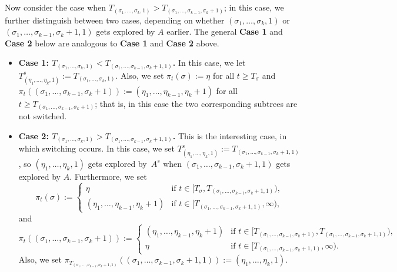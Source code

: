\documentclass[11pt]{article}
\numberwithin{equation}{section}
\theoremstyle{definition}
\begin{document}
Now consider the case when $T_{(\sigma_{1}, \dots, \sigma_{k}, 1)} > T_{(\sigma_{1}, \ldots, \sigma_{k-1}, \sigma_{k} + 1)}$; 
in this case, we further distinguish between two cases, 
depending on whether 
$(\sigma_{1}, \dots, \sigma_{k}, 1)$ 
or 
$\left(\sigma_{1}, \dots, \sigma_{k-1}, \sigma_{k} + 1, 1 \right)$
gets explored by $A$ earlier. 
The general \textbf{Case 1} and \textbf{Case 2} below are analogous to \textbf{Case 1} and \textbf{Case 2} above.
\begin{itemize}
\item \textbf{Case 1: $T_{(\sigma_{1}, \ldots, \sigma_{k}, 1)} < T_{(\sigma_{1}, \ldots, \sigma_{k-1}, \sigma_{k} + 1, 1)}$.} 
In this case, we let 
$T^{s}_{(\eta_{1}, \dots, \eta_{k}, 1)} := T_{(\sigma_{1}, \dots, \sigma_{k}, 1)}$. 
Also, we set 
$\pi_{t} \left( \sigma \right) := \eta$ 
for all $t \geq T_{\sigma}$ 
and $\pi_{t} \left( (\sigma_{1}, \ldots, \sigma_{k-1}, \sigma_{k} + 1) \right) := \left(\eta_{1}, \ldots, \eta_{k-1}, \eta_{k} + 1 \right)$ 
for all $t \geq T_{(\sigma_{1}, \ldots, \sigma_{k-1}, \sigma_{k} + 1)}$; 
that is, in this case the two corresponding subtrees are not switched. 


\item \textbf{Case 2: $T_{(\sigma_{1}, \ldots, \sigma_{k}, 1)} > T_{(\sigma_{1}, \ldots, \sigma_{k-1}, \sigma_{k} + 1, 1)}$.} 
This is the interesting case, in which switching occurs. 
In this case, we set 
$T^{s}_{(\eta_{1}, \ldots, \eta_{k}, 1)} := T_{(\sigma_{1}, \ldots, \sigma_{k-1}, \sigma_{k} + 1, 1)}$, 
so $(\eta_{1}, \ldots, \eta_{k}, 1)$ gets explored by~$A^{s}$ 
when $(\sigma_{1}, \ldots, \sigma_{k-1}, \sigma_{k} + 1, 1)$ gets explored by $A$. 
Furthermore, we set 
\begin{equation*}
    \pi_{t} (\sigma) := 
    \begin{cases}
        \eta &\mbox{if } t \in [T_{\sigma}, T_{(\sigma_{1}, \ldots, \sigma_{k-1}, \sigma_{k} + 1, 1)}), \\
        \left( \eta_{1}, \ldots, \eta_{k-1}, \eta_{k} + 1 \right) &\mbox{if } t \in [T_{(\sigma_{1}, \ldots, \sigma_{k-1}, \sigma_{k} + 1, 1)}, \infty),
    \end{cases}
\end{equation*}
and 
\begin{equation*}
    \pi_{t} ((\sigma_{1}, \ldots, \sigma_{k-1}, \sigma_{k} + 1)) := 
    \begin{cases}
        \left( \eta_{1}, \ldots, \eta_{k-1}, \eta_{k} + 1 \right) &\mbox{if } t \in [T_{(\sigma_{1}, \ldots, \sigma_{k-1}, \sigma_{k} + 1)}, T_{(\sigma_{1}, \ldots, \sigma_{k-1}, \sigma_{k} + 1, 1)}), \\
        \eta &\mbox{if } t \in [T_{(\sigma_{1}, \ldots, \sigma_{k-1}, \sigma_{k} + 1, 1)}, \infty).
    \end{cases}
\end{equation*}
Also, we set 
$\pi_{T_{(\sigma_{1}, \ldots, \sigma_{k-1}, \sigma_{k} + 1, 1)}}((\sigma_{1}, \ldots, \sigma_{k-1}, \sigma_{k} + 1, 1)) := (\eta_{1}, \ldots, \eta_{k}, 1)$. 
\end{itemize}
\end{document}
